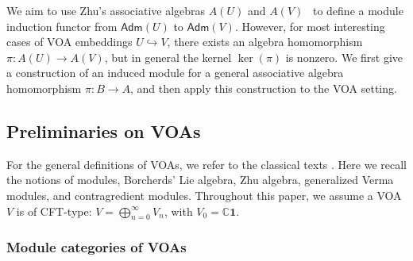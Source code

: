 \documentclass[12pt,a4paper,reqno]{amsart}
\numberwithin{equation}{section}
\numberwithin{equation}{section}
\theoremstyle{definition}
\def \C {\mathbb{C}}
\def \vac {\mathbf{1}}
\def\adm{\mathsf{Adm}}
\begin{document}
We aim to use Zhu's associative algebras $A(U)$ and $A(V)$~\cite{Z} to define a module induction functor from $\adm(U)$ to $\adm(V)$. However, for most interesting cases of VOA embeddings $U \hookrightarrow V$, there exists an algebra homomorphism $\pi: A(U) \to A(V)$, but in general the kernel $\ker(\pi)$ is nonzero. We first give a construction of an induced module for a general associative algebra homomorphism $\pi: B \to A$, and then apply this construction to the VOA setting.


\subsection{Preliminaries on VOAs}
For the general definitions of VOAs, we refer to the classical texts \cite{FLM,FHL,DL,LL,FZ92,Z}. Here we recall the notions of modules, Borcherds' Lie algebra, Zhu algebra, generalized Verma modules, and contragredient modules.
Throughout this paper, we assume a VOA $V$ is of CFT-type: $V=\bigoplus_{n=0}^\infty V_n$, with $V_0=\C\vac$.
\subsubsection{Module categories of VOAs}
\end{document}
